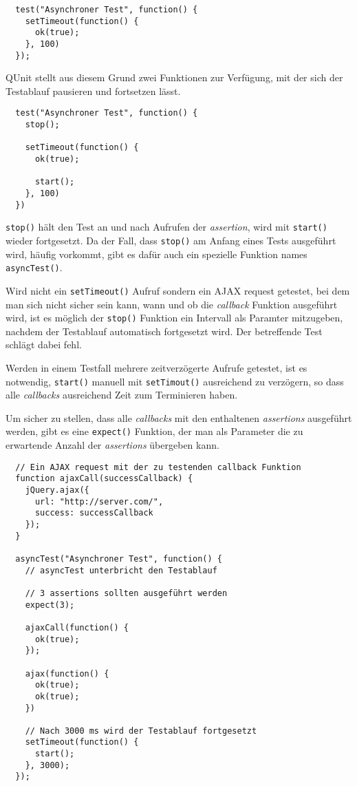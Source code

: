 \documentclass[11pt, a4paper]{article}
\begin{document}
\begin{verbatim}
  test("Asynchroner Test", function() {
    setTimeout(function() {
      ok(true);
    }, 100)
  });
\end{verbatim}

QUnit stellt aus diesem Grund zwei Funktionen zur Verfügung, mit der
sich der Testablauf pausieren und fortsetzen lässt.

\begin{verbatim}
  test("Asynchroner Test", function() {
    stop();

    setTimeout(function() {
      ok(true);

      start();
    }, 100)
  })
\end{verbatim}

\texttt{stop()} hält den Test an und nach Aufrufen der \emph{assertion}, wird
mit \texttt{start()} wieder fortgesetzt. Da der Fall, dass \texttt{stop()} am
Anfang eines Tests ausgeführt wird, häufig vorkommt, gibt es dafür auch ein
spezielle Funktion names \texttt{asyncTest()}.

Wird nicht ein \texttt{setTimeout()} Aufruf sondern ein AJAX request
getestet, bei dem man sich nicht sicher sein kann, wann und ob die
\emph{callback} Funktion ausgeführt wird, ist es möglich der \texttt{stop()}
Funktion ein Intervall als Paramter mitzugeben, nachdem der Testablauf
automatisch fortgesetzt wird. Der betreffende Test schlägt dabei fehl.

Werden in einem Testfall mehrere zeitverzögerte Aufrufe getestet, ist es
notwendig, \texttt{start()} manuell mit \texttt{setTimout()} ausreichend zu
verzögern, so dass alle \emph{callbacks} ausreichend Zeit zum Terminieren haben.

Um sicher zu stellen, dass alle \emph{callbacks} mit den enthaltenen
\emph{assertions} ausgeführt werden, gibt es eine \texttt{expect()} Funktion,
der man als Parameter die zu erwartende Anzahl der \emph{assertions} übergeben
kann.

\begin{verbatim}
  // Ein AJAX request mit der zu testenden callback Funktion
  function ajaxCall(successCallback) {
    jQuery.ajax({
      url: "http://server.com/",
      success: successCallback
    });
  }

  asyncTest("Asynchroner Test", function() {
    // asyncTest unterbricht den Testablauf

    // 3 assertions sollten ausgeführt werden
    expect(3);

    ajaxCall(function() {
      ok(true);
    });

    ajax(function() {
      ok(true);
      ok(true);
    })

    // Nach 3000 ms wird der Testablauf fortgesetzt
    setTimeout(function() {
      start();
    }, 3000);
  });
\end{verbatim}
\end{document}
